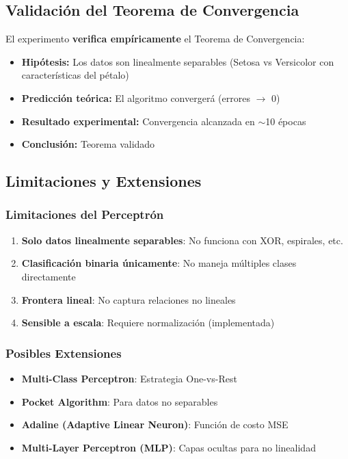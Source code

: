 \documentclass[12pt]{src/formato_utem}
\begin{document}
\subsection{Validación del Teorema de Convergencia}

El experimento \textbf{verifica empíricamente} el Teorema de Convergencia:

\begin{itemize}
    \item \textbf{Hipótesis:} Los datos son linealmente separables (Setosa vs Versicolor con características del pétalo)
    \item \textbf{Predicción teórica:} El algoritmo convergerá (errores $\rightarrow$ 0)
    \item \textbf{Resultado experimental:} Convergencia alcanzada en $\sim$10 épocas
    \item \textbf{Conclusión:} Teorema validado
\end{itemize}

\subsection{Limitaciones y Extensiones}

\subsubsection{Limitaciones del Perceptrón}

\begin{enumerate}
    \item \textbf{Solo datos linealmente separables}: No funciona con XOR, espirales, etc.
    \item \textbf{Clasificación binaria únicamente}: No maneja múltiples clases directamente
    \item \textbf{Frontera lineal}: No captura relaciones no lineales
    \item \textbf{Sensible a escala}: Requiere normalización (implementada)
\end{enumerate}

\subsubsection{Posibles Extensiones}

\begin{itemize}
    \item \textbf{Multi-Class Perceptron}: Estrategia One-vs-Rest
    \item \textbf{Pocket Algorithm}: Para datos no separables
    \item \textbf{Adaline (Adaptive Linear Neuron)}: Función de costo MSE
    \item \textbf{Multi-Layer Perceptron (MLP)}: Capas ocultas para no linealidad
\end{itemize}
\end{document}
